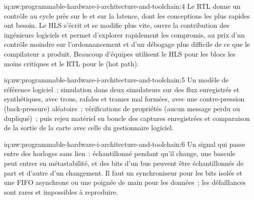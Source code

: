 \begin{solution}{iq:nw:programmable-hardware-i-architecture-and-toolchain:4}
Le RTL donne un contrôle au cycle près sur le  et sur la latence, dont les conceptions les plus rapides ont besoin. Le HLS s'écrit et se modifie plus vite, ouvre
la contribution des ingénieurs logiciels et permet d'explorer rapidement les compromis, au prix d'un contrôle moindre sur l'ordonnancement et d'un débogage plus difficile de ce que
le compilateur a produit. Beaucoup d'équipes utilisent le HLS pour les blocs les moins critiques et le RTL pour le  (hot path).
\end{solution}

\begin{solution}{iq:nw:programmable-hardware-i-architecture-and-toolchain:5}
Un modèle de référence logiciel~; simulation dans deux simulateurs sur des flux enregistrés et synthétiques, avec trous, rafales et trames mal formées,
avec une contre-pression (back-pressure) aléatoire~; vérifications de propriétés (aucun message perdu ou dupliqué)~; puis rejeu matériel en boucle des captures enregistrées et
comparaison de la sortie de la carte avec celle du gestionnaire logiciel.
\end{solution}

\begin{solution}{iq:nw:programmable-hardware-i-architecture-and-toolchain:6}
Un signal qui passe entre des horloges sans lien~: échantillonné pendant qu'il change, une bascule peut entrer en métastabilité, et des bits d'un bus peuvent être
échantillonnés de part et d'autre d'un changement. Il faut un synchroniseur pour les bits isolés et une FIFO asynchrone ou une poignée de main pour les données~; les défaillances
sont rares et impossibles à reproduire.
\end{solution}
